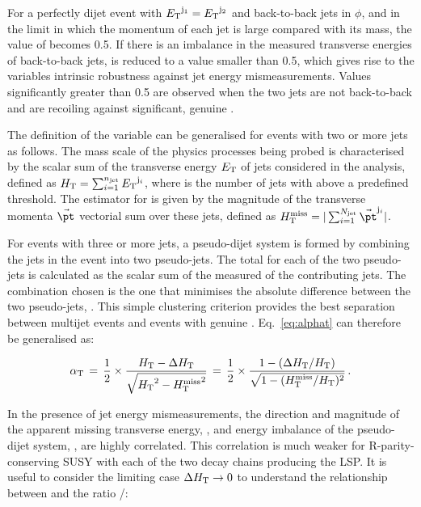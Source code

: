 For a perfectly dijet event with ${E_{\text T}}^{\rm j_1} = {E_{\text T}}^{\rm j_2}$ and back-to-back jets in $\phi$, and in the limit in which the
momentum of each jet is large compared with its mass, the value of \alphat becomes 0.5. If there is an imbalance in the measured
transverse energies of back-to-back jets, \alphat is reduced to a value smaller than 0.5, which gives rise to the variables intrinsic
robustness against jet energy mismeasurements. Values significantly greater than 0.5 are observed when the two jets are not 
back-to-back and are recoiling against significant, genuine \met.

The definition of the \alphat variable can be generalised for events with two or more jets as follows. The mass scale of the physics
processes being probed is characterised by the scalar sum of the transverse energy ${E_{\text T}}$ of jets considered in the analysis, defined as
$\mbox{$H_\text{T}$} = \sum_{i=1}^{n_{\text{jet}}} {E_{\text T}}^{{\rm j}_i}$, where \njet is the number of jets with \Et above a predefined threshold. The estimator
for \met is given by the magnitude of the transverse momenta $\vec{\pt}$ vectorial sum over these jets, defined as $\mht =
|\sum_{i=1}^{N_{\rm jet}} \vec{\pt}^{{\rm j}_i}|$. 

For events with three or more jets, a pseudo-dijet system is formed by combining the jets in the event into two pseudo-jets. The total \Et
for each of the two pseudo-jets is calculated as the scalar sum of the measured \Et of the contributing jets. The combination chosen is the
one that minimises the absolute \Et difference between the two pseudo-jets, \dht. This simple clustering criterion provides the best
separation between multijet events and events with genuine \met. Eq.~\ref{eq:alphat} can therefore be generalised as:

\begin{equation}
  \label{eq:alphat2}
  \alpha_{\text{T}}\, = \,\frac{1}{2} \times \frac{\mbox{$H_\text{T}$} -
    \Delta\mbox{$H_\text{T}$}}{\sqrt{\mbox{$H_\text{T}$}^2 - \mbox{$H_{\rm T}^{\rm miss}$}^2}} \, = \,\frac{1}{2} \times 
  \frac{1 - (\Delta\mbox{$H_\text{T}$}/\mbox{$H_\text{T}$})}{\sqrt{1 - (\mbox{$H_{\rm T}^{\rm miss}$}/\mbox{$H_\text{T}$})^2}} \, . 
\end{equation}

In the presence of jet energy mismeasurements, the direction and magnitude of the apparent missing transverse energy, \mht, and energy
imbalance of the pseudo-dijet system, \dht, are highly correlated. This correlation is much weaker for R-parity-conserving SUSY with each
of the two decay chains producing the LSP. It is useful to consider the limiting case $\Delta\mbox{$H_\text{T}$} \rightarrow 0$ to
understand the relationship between \alphat and the ratio \mht/\scalht:

